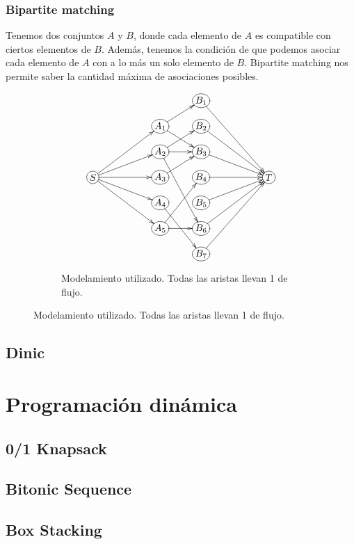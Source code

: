 \documentclass[oneside]{book}
\begin{document}
	\subsection{Bipartite matching}
	Tenemos dos conjuntos $A$ y $B$, donde cada elemento de $A$ es compatible con ciertos elementos de $B$. Adem\'as, tenemos la condici\'on de que podemos asociar cada elemento de $A$ con a lo m\'as un solo elemento de $B$. Bipartite matching nos permite saber la cantidad m\'axima de asociaciones posibles.
\begin{figure}[h]
\centering
\begin{subfigure}{.5\textwidth}
\begin{displaymath}
\xymatrix@R-1pc{
&&&*+[o][F-]{B_1} \ar[dddrr] \\
&&*+[o][F-]{A_1} \ar[ur] \ar[dr]
&*+[o][F-]{B_2} \ar[ddrr] \\
&&*+[o][F-]{A_2} \ar[r] \ar[dddr] \ar[ur]
&*+[o][F-]{B_3} \ar[drr] \\
*+[o][F-]{S} \ar[rruu] \ar[rru] \ar[rr] \ar[rrd] \ar[rrdd]
&&*+[o][F-]{A_3} \ar[ur]
&*+[o][F-]{B_4} \ar[rr]
&&*+[o][F-]{T} \\
&&*+[o][F-]{A_4} \ar[ddr]
&*+[o][F-]{B_5} \ar[urr] \\
&&*+[o][F-]{A_5} \ar[r] \ar[uur]
&*+[o][F-]{B_6} \ar[uurr] \\
&&&*+[o][F-]{B_7} \ar[uuurr]
}
\end{displaymath}
\caption*{Modelamiento utilizado. Todas las aristas llevan 1 de flujo.}
\end{subfigure}

\end{figure}

\section{Dinic}
	
	\chapter{Programaci\'on din\'amica}
	\section{0/1 Knapsack}
	
	\section{Bitonic Sequence}
	
	\section{Box Stacking}
	
\end{document}
